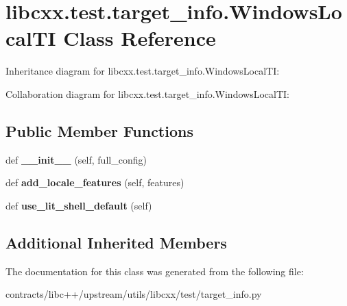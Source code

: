 \hypertarget{classlibcxx_1_1test_1_1target__info_1_1_windows_local_t_i}{}\section{libcxx.\+test.\+target\+\_\+info.\+Windows\+Local\+TI Class Reference}
\label{classlibcxx_1_1test_1_1target__info_1_1_windows_local_t_i}


Inheritance diagram for libcxx.\+test.\+target\+\_\+info.\+Windows\+Local\+TI\+:


Collaboration diagram for libcxx.\+test.\+target\+\_\+info.\+Windows\+Local\+TI\+:
\subsection*{Public Member Functions}
\begin{DoxyCompactItemize}
\item 
\mbox{\label{classlibcxx_1_1test_1_1target__info_1_1_windows_local_t_i_abd89370f4b088066b5c8d0dd736c4666}} 
def {\bfseries \+\_\+\+\_\+init\+\_\+\+\_\+} (self, full\+\_\+config)
\item 
\mbox{\label{classlibcxx_1_1test_1_1target__info_1_1_windows_local_t_i_ab06ed961e233538af6871f8331af525a}} 
def {\bfseries add\+\_\+locale\+\_\+features} (self, features)
\item 
\mbox{\label{classlibcxx_1_1test_1_1target__info_1_1_windows_local_t_i_a18dc317de92da40bef3f7d975921a801}} 
def {\bfseries use\+\_\+lit\+\_\+shell\+\_\+default} (self)
\end{DoxyCompactItemize}
\subsection*{Additional Inherited Members}


The documentation for this class was generated from the following file\+:\begin{DoxyCompactItemize}
\item 
contracts/libc++/upstream/utils/libcxx/test/target\+\_\+info.\+py\end{DoxyCompactItemize}
